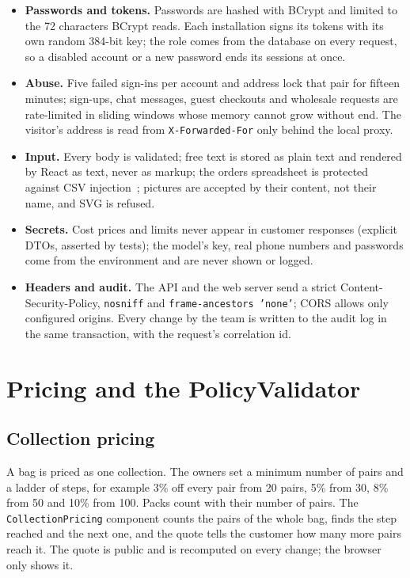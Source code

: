\begin{itemize}
	\item \textbf{Passwords and tokens.} Passwords are hashed with BCrypt and limited to the 72 characters BCrypt reads.
	Each installation signs its tokens with its own random 384-bit key; the role comes from the database on every
	request, so a disabled account or a new password ends its sessions at once.
	\item \textbf{Abuse.} Five failed sign-ins per account and address lock that pair for fifteen minutes; sign-ups, chat
	messages, guest checkouts and wholesale requests are rate-limited in sliding windows whose memory cannot grow
	without end. The visitor's address is read from \texttt{X-Forwarded-For} only behind the local proxy.
	\item \textbf{Input.} Every body is validated; free text is stored as plain text and rendered by React as text,
	never as markup; the orders spreadsheet is protected against CSV injection~\cite{owaspcsv}; pictures are accepted
	by their content, not their name, and SVG is refused.
	\item \textbf{Secrets.} Cost prices and limits never appear in customer responses (explicit DTOs, asserted by tests);
	the model's key, real phone numbers and passwords come from the environment and are never shown or logged.
	\item \textbf{Headers and audit.} The API and the web server send a strict Content-Security-Policy,
	\texttt{nosniff} and \texttt{frame-ancestors 'none'}; CORS allows only configured origins. Every change by the team is
	written to the audit log in the same transaction, with the request's correlation id.
\end{itemize}

\section{Pricing and the PolicyValidator}
\label{sec:pricing}

\subsection{Collection pricing}

A bag is priced as one collection. The owners set a minimum number of pairs and a ladder of steps, for example 3\% off
every pair from 20 pairs, 5\% from 30, 8\% from 50 and 10\% from 100. Packs count with their number of pairs. The
\texttt{CollectionPricing} component counts the pairs of the whole bag, finds the step reached and the next one, and
the quote tells the customer how many more pairs reach it. The quote is public and is recomputed on every change; the
browser only shows it.


